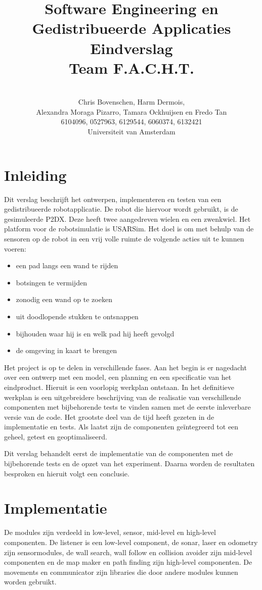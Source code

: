 \documentclass[a4paper,10pt]{article}
\title{Software Engineering en Gedistribueerde Applicaties \\[10pt]Eindverslag\\[25pt]Team F.A.C.H.T.}
\author{\\Chris Bovenschen, Harm Dermois, \\Alexandra Moraga Pizarro, Tamara Ockhuijsen en Fredo Tan \\[10pt]6104096, 0527963, 6129544, 6060374, 6132421 \\[25pt]Universiteit van Amsterdam}
\begin{document}
\maketitle

\newpage
\tableofcontents

\newpage
\section{Inleiding}
Dit verslag beschrijft het ontwerpen, implementeren en testen van een gedistribueerde robotapplicatie. De robot die hiervoor wordt gebruikt, is de gesimuleerde P2DX. Deze heeft twee aangedreven wielen en een zwenkwiel. Het platform voor de robotsimulatie is USARSim. Het doel is om met behulp van de sensoren op de robot in een vrij volle ruimte de volgende acties uit te kunnen voeren:
\begin{itemize}
  \item een pad langs een wand te rijden
  \item botsingen te vermijden
  \item zonodig een wand op te zoeken
  \item uit doodlopende stukken te ontsnappen
  \item bijhouden waar hij is en welk pad hij heeft gevolgd
  \item de omgeving in kaart te brengen
\end{itemize}
Het project is op te delen in verschillende fases. Aan het begin is er nagedacht over een ontwerp met een model, een planning en een specificatie van het eindproduct. Hieruit is een voorlopig werkplan ontstaan. In het definitieve werkplan is een uitgebreidere beschrijving van de realisatie van verschillende componenten met bijbehorende tests te vinden samen met de eerste inleverbare versie van de code. Het grootste deel van de tijd heeft gezeten in de implementatie en tests. Als laatst zijn de componenten ge\"{i}ntegreerd tot een geheel, getest en geoptimaliseerd.

Dit verslag behandelt eerst de implementatie van de componenten met de bijbehorende tests en de opzet van het experiment. Daarna worden de resultaten besproken en hieruit volgt een conclusie.

\newpage

\section{Implementatie}
De modules zijn verdeeld in low-level, sensor, mid-level en high-level componenten. De listener is een low-level component, de sonar, laser en odometry zijn sensormodules, de wall search, wall follow en collision avoider zijn mid-level componenten en de map maker en path finding zijn high-level componenten. De movements en communicator zijn libraries die door andere modules kunnen worden gebruikt. 
\end{document}
